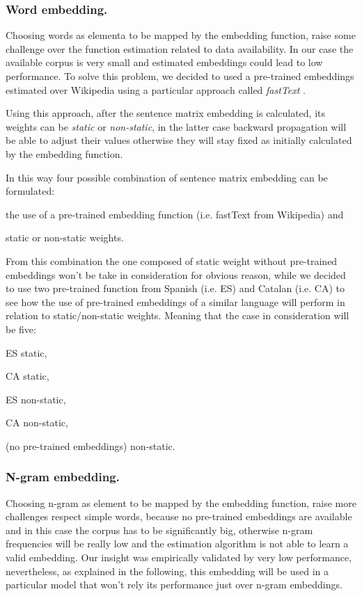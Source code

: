 \subsubsection{Word embedding.}
Choosing words as elementa to be mapped by the embedding function, raise some challenge over the function estimation related to data availability. In our case the available corpus is very small and estimated embeddings could lead to low performance.
To solve this problem, we decided to used a pre-trained embeddings estimated over Wikipedia using a particular approach called \emph{fastText} \cite{bojanowski2016enriching}.

Using this approach, after the sentence matrix embedding is calculated, its weights can be \emph{static} or \emph{non-static}, in the latter case backward propagation will be able to adjust their values otherwise they will stay fixed as initially calculated by the embedding function.

In this way four possible combination of sentence matrix embedding can be formulated: 
\begin{enumerate*}
\item the use of a pre-trained embedding function (i.e. fastText from Wikipedia) and
\item static or non-static weights.
\end{enumerate*}
From this combination the one composed of static weight without pre-trained embeddings won't be take in consideration for obvious reason, while we decided to use two pre-trained function from Spanish (i.e. ES) and Catalan (i.e. CA) to see how the use of pre-trained embeddings of a similar language will perform in relation to static/non-static weights.
Meaning that the case in consideration will be five:
\begin{enumerate*}
\item ES static,
\item CA static,
\item ES non-static,
\item CA non-static,
\item (no pre-trained embeddings) non-static.
\end{enumerate*}

\subsubsection{N-gram embedding.}
Choosing n-gram as element to be mapped by the embedding function, raise more challenges respect simple words, because no pre-trained embeddings are available and in this case the corpus has to be significantly big, otherwise n-gram frequencies will be really low and the estimation algorithm is not able to learn a valid embedding.
Our insight was empirically validated by very low performance, nevertheless, as explained in the following, this embedding will be used in a particular model that won't rely its performance just over n-gram embeddings.


